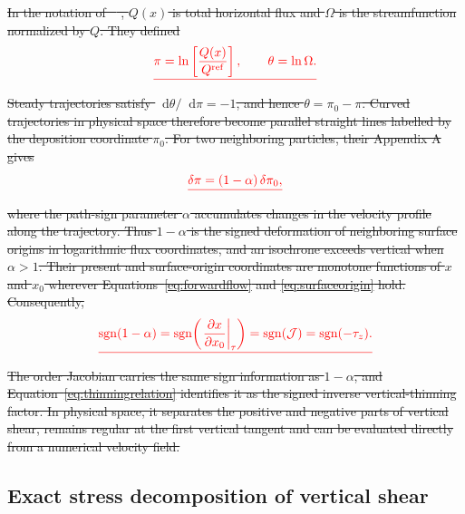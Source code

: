 \documentclass[review]{igs}
\providecommand{\DIFdel}[1]{{\protect\color{red}\sout{#1}}}                      %
\providecommand{\DIFdelbegin}{} %
\providecommand{\DIFdelend}{} %
\newcommand{\DIFscaledelfig}{0.5}
\newlength{\DIFdelgraphicswidth} %
\newlength{\DIFdelgraphicsheight} %
\newcommand{\DIFdelincludegraphics}[2][]{%
\sbox{\DIFdelgraphicsbox}{\DIFOincludegraphics[#1]{#2}}%
\settoboxwidth{\DIFdelgraphicswidth}{\DIFdelgraphicsbox} %
\settoboxtotalheight{\DIFdelgraphicsheight}{\DIFdelgraphicsbox} %
\scalebox{\DIFscaledelfig}{%
\parbox[b]{\DIFdelgraphicswidth}{\usebox{\DIFdelgraphicsbox}\\[-\baselineskip] \rule{\DIFdelgraphicswidth}{0em}}\llap{\resizebox{\DIFdelgraphicswidth}{\DIFdelgraphicsheight}{%
\setlength{\unitlength}{\DIFdelgraphicswidth}%
\begin{picture}(1,1)%
\thicklines\linethickness{2pt} %
{\color[rgb]{1,0,0}\put(0,0){\framebox(1,1){}}}%
{\color[rgb]{1,0,0}\put(0,0){\line( 1,1){1}}}%
{\color[rgb]{1,0,0}\put(0,1){\line(1,-1){1}}}%
\end{picture}%
}\hspace*{3pt}}} %
} %
\DeclareRobustCommand{\DIFdelbegin}{\DIFOdelbegin \let\includegraphics\DIFdelincludegraphics} %
\DeclareRobustCommand{\DIFdelend}{\DIFOaddend \let\includegraphics\DIFOincludegraphics} %
\begin{document}
\DIFdelbegin \DIFdel{In the notation of \mbox{%
\citet{ParreninHindmarsh2007}}\hskip0pt%
, \(Q(x)\) is total horizontal flux and \(\Omega\) is the streamfunction normalized by \(Q\). They defined
}\begin{displaymath}
\DIFdel{\pi=\ln\left[\frac{Q(x)}{Q^{\mathrm{ref}}}\right],
\qquad
\theta=\ln\Omega.
}\end{displaymath}%
\DIFdel{Steady trajectories satisfy \(\mathop{}\!\mathrm{d}\theta/\mathop{}\!\mathrm{d}\pi=-1\), and hence \(\theta=\pi_0-\pi\). Curved trajectories in physical space therefore become parallel straight lines labelled by the deposition coordinate \(\pi_0\). For two neighboring particles, their Appendix A gives
}\begin{displaymath}
\DIFdel{\delta\pi=(1-\alpha)\,\delta\pi_0,
}\end{displaymath}%
\DIFdel{where the path-sign parameter \(\alpha\) accumulates changes in the velocity profile along the trajectory. Thus \(1-\alpha\) is the signed deformation of neighboring surface origins in logarithmic flux coordinates, and an isochrone exceeds vertical when \(\alpha>1\). Their present and surface-origin coordinates are monotone functions of \(x\) and \(x_0\) wherever Equations~\ref{eq:forwardflow} and \ref{eq:surfaceorigin} hold. Consequently,
}\begin{displaymath}
\DIFdel{\operatorname{sgn}(1-\alpha)
=\operatorname{sgn}\!\left(
\left.\frac{\partial x}{\partial x_0}\right|_{\tau}
\right)
=\operatorname{sgn}(\mathcal{J})
=\operatorname{sgn}(-\tau_z).
}\end{displaymath}%
\DIFdel{The order Jacobian carries the same sign information as \(1-\alpha\), and Equation~\ref{eq:thinningrelation} identifies it as the signed inverse vertical-thinning factor. In physical space, it separates the positive and negative parts of vertical shear, remains regular at the first vertical tangent and can be evaluated directly from a numerical velocity field.
}%


\DIFdelend \subsection{Exact stress decomposition of vertical shear}
\end{document}
